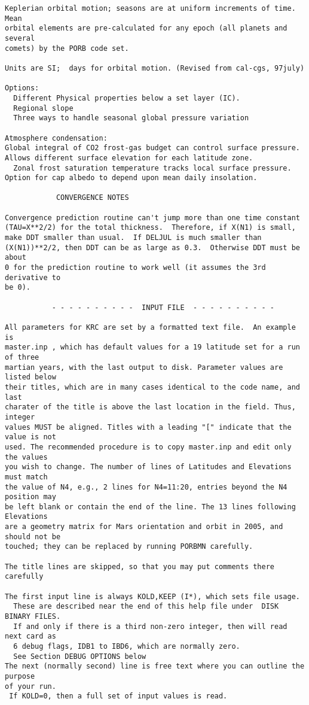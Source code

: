 \begin{verbatim}
Keplerian orbital motion; seasons are at uniform increments of time. Mean 
orbital elements are pre-calculated for any epoch (all planets and several
comets) by the PORB code set.

Units are SI;  days for orbital motion. (Revised from cal-cgs, 97july)

Options:
  Different Physical properties below a set layer (IC).
  Regional slope
  Three ways to handle seasonal global pressure variation

Atmosphere condensation: 
Global integral of CO2 frost-gas budget can control surface pressure.
Allows different surface elevation for each latitude zone.
  Zonal frost saturation temperature tracks local surface pressure.
Option for cap albedo to depend upon mean daily insolation.

			CONVERGENCE NOTES

Convergence prediction routine can't jump more than one time constant
(TAU=X**2/2) for the total thickness.  Therefore, if X(N1) is small,
make DDT smaller than usual.  If DELJUL is much smaller than 
(X(N1))**2/2, then DDT can be as large as 0.3.  Otherwise DDT must be about
0 for the prediction routine to work well (it assumes the 3rd derivative to
be 0).

           - - - - - - - - - -  INPUT FILE  - - - - - - - - - - 

All parameters for KRC are set by a formatted text file.  An example is
master.inp , which has default values for a 19 latitude set for a run of three
martian years, with the last output to disk. Parameter values are listed below
their titles, which are in many cases identical to the code name, and last
charater of the title is above the last location in the field. Thus, integer
values MUST be aligned. Titles with a leading "[" indicate that the value is not
used. The recommended procedure is to copy master.inp and edit only the values
you wish to change. The number of lines of Latitudes and Elevations must match
the value of N4, e.g., 2 lines for N4=11:20, entries beyond the N4 position may
be left blank or contain the end of the line. The 13 lines following Elevations
are a geometry matrix for Mars orientation and orbit in 2005, and should not be
touched; they can be replaced by running PORBMN carefully.

The title lines are skipped, so that you may put comments there carefully

The first input line is always KOLD,KEEP (I*), which sets file usage.
  These are described near the end of this help file under  DISK BINARY FILES.
  If and only if there is a third non-zero integer, then will read next card as
  6 debug flags, IDB1 to IBD6, which are normally zero. 
  See Section DEBUG OPTIONS below
The next (normally second) line is free text where you can outline the purpose 
of your run. 
 If KOLD=0, then a full set of input values is read. 


\end{verbatim}
